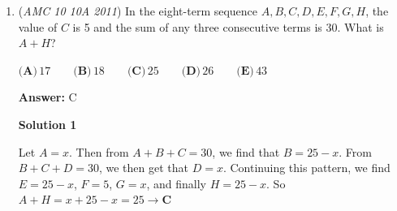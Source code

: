 \begin{enumerate}
 We can quickly check our answer by estimating $\sqrt2=1.41$ and $\sqrt3=1.73$: $\sqrt3\left(\sqrt{3-2\sqrt2}+\sqrt{3+2\sqrt2}\right)$ becomes $\sqrt3\left(\sqrt{3-2\cdot1.41}+\sqrt{3+2\cdot1.41}\right)=\sqrt3\left(\sqrt{3-2.82}+\sqrt{3+2.82}\right)=\sqrt3\left(\sqrt{0.18}+\sqrt{5.82}\right)\approx\sqrt3\left(\dfrac{3\sqrt2}{10}+2.4\right)\approx1.73\left(\dfrac{3\cdot1.41}{10}+2.4\right)=1.73\left(0.423+2.4\right)=1.73\left(2.823\right)\approx1.7\cdot2.8\approx4.76.$ This should be our approximate answer. We got $2\sqrt6=2\sqrt2\cdot\sqrt3\approx2\cdot1.41\cdot1.73=2.82\cdot1.73\approx2.8\cdot1.7=4.76$ - the same thing. ~Technodoggo

 



\textbf{Solution 6}

Set $a = 9$ and $b= 6\sqrt{2}$ and thus

 
 \[\sqrt{a-b} + \sqrt{a+b} = k\]
 \[a-b + 2\sqrt{a^2-b^2} + a+b = k^2\]
 \[2\sqrt{a^2-b^2} = k^2-2a\]
 \[4a^2 - 4b^2 = k^4 - 4k^2a + 4a^2\]
 \[4b^2 = 4k^2a - k^4\]

 Substitution of our reverse findings, we have $288 = 36k^2 - k^4$. If $x = k^2$, then $0 = x^2 -36x + 288$. Thus, $(x-12)(x-24) = 0$, and thus $x = 12,24$ in which $k = 2\sqrt{3},2\sqrt{6}$.

 From here, one can see the answer choices and get the answer immediately. And, in real competition, you would do that! However, since this is a solution, we will go over it in more detail; why doesn't $k^2 = 12$ work?

 Recall that $2\sqrt{a^2-b^2} = k^2-2a$. If $k^2 = 12$, then $2a = 18$, and thus we have a negative number, which is precisely why $k=24$ \textbf{must} work.

 Thus, the answer is indeed $\boxed{2\sqrt{6}}$



	\item (\textit{AMC 10 10A 2011}) In the eight-term sequence $A,B,C,D,E,F,G,H$, the value of $C$ is 5 and the sum of any three consecutive terms is 30.  What is $A+H$?


 $\textbf{(A)}\,17 \qquad\textbf{(B)}\,18 \qquad\textbf{(C)}\,25 \qquad\textbf{(D)}\,26 \qquad\textbf{(E)}\,43$

 \textbf{Answer: }C



\textbf{Solution 1}

Let $A=x$. Then from $A+B+C=30$, we find that $B=25-x$. From $B+C+D=30$, we then get that $D=x$. Continuing this pattern, we find $E=25-x$, $F=5$, $G=x$, and finally $H=25-x$. So $A+H=x+25-x=25 \rightarrow \boxed{\textbf{C}}$





\end{enumerate}
